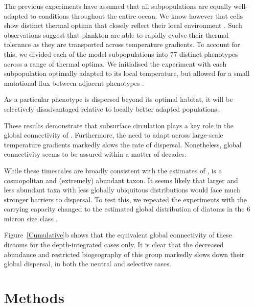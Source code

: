 \documentclass[12pt]{article}
\begin{document}
The previous experiments have assumed that all subpopulations are equally well-adapted to conditions throughout the entire ocean. We know however that cells show distinct thermal optima that closely reflect their local environment \citep{Thomas:2012}. Such observations suggest that plankton are able to rapidly evolve their thermal tolerance as they are transported across temperature gradients. To account for this, we divided each of the model subpopulations into 77 distinct phenotypes across a range of thermal optima. We initialised the experiment with each subpopulation optimally adapted to its local temperature, but allowed for a small mutational flux between adjacent phenotypes \citep{Sauterey:2017,Beckman:2019}.

As a particular phenotype is dispersed beyond its optimal habitat, it will be selectively disadvantaged relative to locally better adapted populations..

These results demonstrate that subsurface circulation plays a key role in the global connectivity of \citep{Prochlorococcus}. Furthermore, the need to adapt across large-scale temperature gradients markedly slows the rate of dispersal. Nonetheless, global connectivity seems to be assured within a matter of decades. 

While these timescales are broadly consistent with the estimates of \citet{Jonsson:2016}, \citep{Prochlorococcus} is a cosmopolitan and (extremely) abundant taxon. It seems likely that larger and less abundant taxa with less globally ubiquitous distributions would face much stronger barriers to dispersal. To test this, we repeated the experiments with the carrying capacity changed to the estimated global distribution of diatoms in the 6 micron size class \citep{Dutkiewicz:2019}.

Figure~\ref{Cumulative}b shows that the equivalent global connectivity of these diatoms for the depth-integrated cases only. It is clear that the decreased abundance and restricted biogeography of this group markedly slows down their global dispersal, in both the neutral and selective cases. 












\section{Methods}
\end{document}
